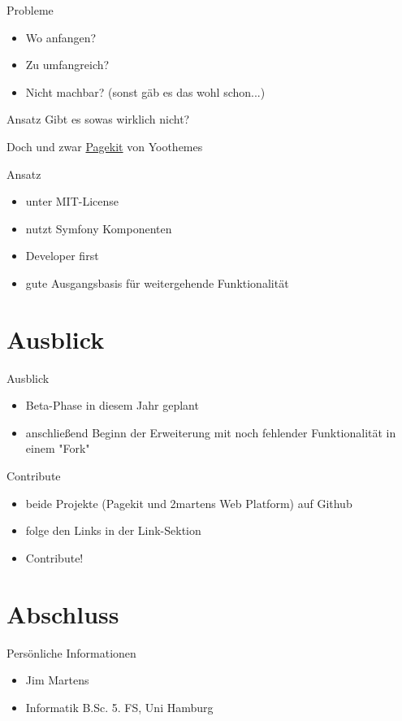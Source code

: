 \documentclass{beamer}
\begin{document}
	\begin{frame}{Probleme}
		\begin{itemize}
			\item Wo anfangen?
			\item Zu umfangreich?
			\item Nicht machbar? (sonst gäb es das wohl schon...)
		\end{itemize}
	\end{frame}
	
	\begin{frame}{Ansatz}
		\centering
		Gibt es sowas wirklich nicht?
		
		 {Doch und zwar \href{http://www.pagekit.com}{Pagekit} von Yoothemes}
	\end{frame}
	\begin{frame}{Ansatz}
		\begin{itemize}
			\item unter MIT-License
			\item nutzt Symfony Komponenten
			\item Developer first
			\item gute Ausgangsbasis für weitergehende Funktionalität
		\end{itemize}
	\end{frame}
	
	\section{Ausblick}
	\begin{frame}{Ausblick}
		\begin{itemize}
			\item Beta-Phase in diesem Jahr geplant
			\item anschließend Beginn der Erweiterung mit noch fehlender Funktionalität in einem "Fork"
		\end{itemize}
	\end{frame}
	
	\begin{frame}{Contribute}
		\begin{itemize}
			\item beide Projekte (Pagekit und 2martens Web Platform) auf Github
			\item folge den Links in der Link-Sektion
			\item Contribute!
		\end{itemize}
	\end{frame}
	
	\section{Abschluss}
	\begin{frame}{Persönliche Informationen}
		\begin{itemize}
			\item Jim Martens
			\item Informatik B.Sc. 5. FS, Uni Hamburg
		\end{itemize}
	\end{frame}	
	
\end{document}
